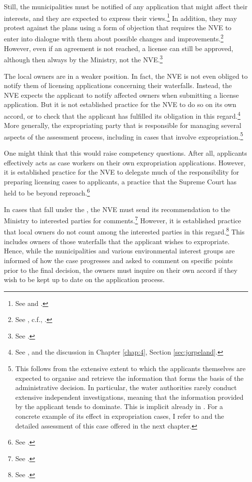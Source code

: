 Still, the municipalities must be notified of any application that might affect their interests, and they are expected to express their views.\footnote{See \cite[8]{wra17} and \cite[24]{wra00}.} In addition, they may protest against the plans using a form of objection that requires the NVE to enter into dialogue with them about possible changes and improvements.\footnote{See \cite[5-4,5-6]{pb08}, c.f., \cite[24]{wra00}.} However, even if an agreement is not reached, a license can still be approved, although then always by the Ministry, not the NVE.\footnote{See \cite[5-6]{pb08}.}

The local owners are in a weaker position. In fact, the NVE is not even obliged to notify them of licensing applications concerning their waterfalls. Instead, the NVE expects the applicant to notify affected owners when submitting a license application. But it is not established practice for the NVE to do so on its own accord, or to check that the applicant has fulfilled its obligation in this regard.\footnote{See \cite{jorpeland11}, and the discussion in Chapter \ref{chap:4}, Section \ref{sec:jorpeland}.} More generally, the expropriating party that is responsible for managing several aspects of the assessment process, including in cases that involve expropriation.\footnote{This follows from the extensive extent to which the applicants themselves are expected to organise and retrieve the information that forms the basis of the administrative decision. In particular, the water authorities rarely conduct extensive independent investigations, meaning that the information provided by the applicant tends to dominate. This is implicit already in \cite{stokker10}. For a concrete example of its effect in expropriation cases, I refer to \cite{jorpeland11} and the detailed assessment of this case offered in the next chapter.}

One might think that this would raise competency questions. After all, applicants effectively acts as case workers on their own expropriation applications. However, it is established practice for the NVE to delegate much of the responsibility for preparing licensing cases to applicants, a practice that the Supreme Court has held to be beyond reproach.\footnote{See \cite{jorpeland11}.}

In cases that fall under the \cite{wra17}, the NVE must send its recommendation to the Ministry to interested parties for comments.\footnote{See \cite[6]{wra17}.} However, it is established practice that local owners do not count among the interested parties in this regard.\footnote{See \cite{jorpeland11}.} This includes owners of those waterfalls that the applicant wishes to expropriate. Hence, while the municipalities and various environmental interest groups are informed of how the case progresses and asked to comment on specific points prior to the final decision, the owners must inquire on their own accord if they wish to be kept up to date on the application process.

